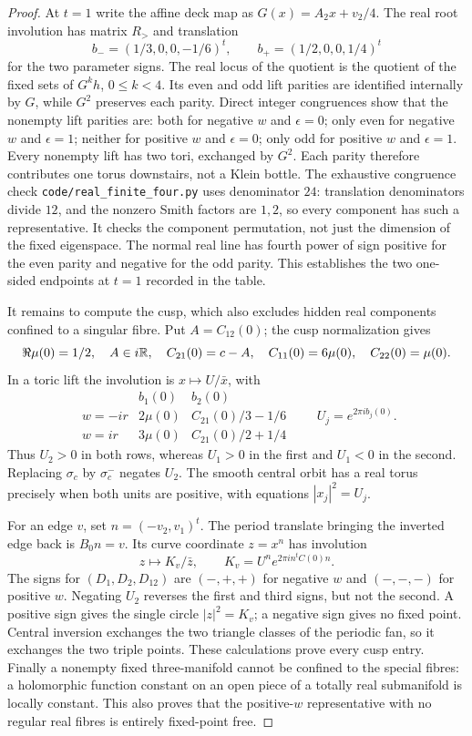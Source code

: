 \begin{proof}
At $t=1$ write the affine deck map as
$G(x)=A_2x+v_2/4$. The real root involution has matrix $R_>$ and
translation
\[
 b_-=(1/3,0,0,-1/6)^t,
 \qquad b_+=(1/2,0,0,1/4)^t
\]
for the two parameter signs. The real locus of the quotient is the
quotient of the fixed sets of $G^kh$, $0\leq k<4$. Its even and odd
lift parities are identified internally by $G$, while $G^2$ preserves
each parity. Direct integer congruences show that the nonempty lift
parities are: both for negative $w$ and $\epsilon=0$; only even for
negative $w$ and $\epsilon=1$; neither for positive $w$ and $\epsilon=0$;
only odd for positive $w$ and $\epsilon=1$. Every nonempty lift has
two tori, exchanged by $G^2$. Each parity therefore contributes one
torus downstairs, not a Klein bottle. The exhaustive congruence check
\texttt{code/real\_finite\_four.py} uses denominator $24$: translation
denominators divide $12$, and the nonzero Smith factors are $1,2$, so
every component has such a representative. It checks the component
permutation, not just the dimension of the fixed eigenspace. The normal
real line has fourth power of sign positive for the even parity and
negative for the odd parity. This establishes the two one-sided
endpoints at $t=1$ recorded in the table.

It remains to compute the cusp, which also excludes hidden real
components confined to a singular fibre. Put
$A=C_{12}(0)$; the cusp normalization gives
\[
 \Re\mu(0)=1/2,\quad A\in i\mathbb R,\quad C_{21}(0)=c-A,
 \quad C_{11}(0)=6\mu(0),\quad C_{22}(0)=\mu(0).
\]
In a toric lift the involution is
$x\mapsto U/\bar x$, with
\[
\begin{array}{c|cc}
 &b_1(0)&b_2(0)\\\hline
 w=-ir&2\mu(0)&C_{21}(0)/3-1/6\\
 w=ir&3\mu(0)&C_{21}(0)/2+1/4
\end{array}
\qquad U_j=e^{2\pi i b_j(0)}.
\tag{A.3.7}
\]
Thus $U_2>0$ in both rows, whereas $U_1>0$ in the first and $U_1<0$
in the second. Replacing $\sigma_c$ by $\sigma_c^-$ negates $U_2$.
The smooth central orbit has a real torus precisely when both units
are positive, with equations $|x_j|^2=U_j$.

For an edge $v$, set $n=(-v_2,v_1)^t$. The period translate bringing
the inverted edge back is $B_0n=v$. Its curve coordinate $z=x^n$ has
involution
\[
 z\longmapsto K_v/\bar z,
 \qquad K_v=U^n e^{2\pi i n^tC(0)n}.
 \tag{A.3.8}
\]
The signs for $(D_1,D_2,D_{12})$ are $(-,+,+)$ for negative $w$
and $(-,-,-)$ for positive $w$. Negating $U_2$ reverses the first and
third signs, but not the second. A positive sign gives the single
circle $|z|^2=K_v$; a negative sign gives no fixed point. Central
inversion exchanges the two triangle classes of the periodic fan, so
it exchanges the two triple points. These calculations prove every
cusp entry. Finally a nonempty fixed three-manifold cannot be confined
to the special fibres: a holomorphic function constant on an open
piece of a totally real submanifold is locally constant. This also
proves that the positive-$w$ representative with no regular real
fibres is entirely fixed-point free.
\end{proof}

